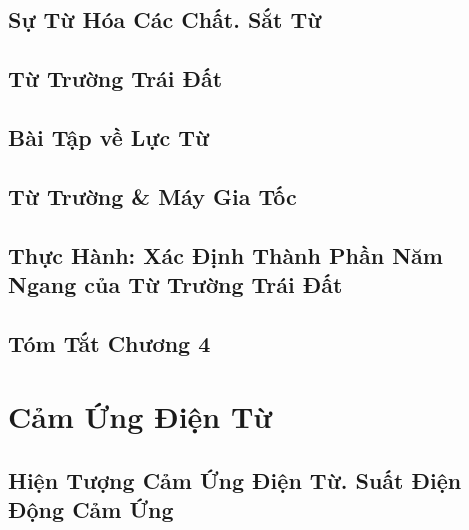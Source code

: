 \documentclass[oneside]{book}
\numberwithin{equation}{section}
\begin{document}
\section{Sự Từ Hóa Các Chất. Sắt Từ}


\section{Từ Trường Trái Đất}


\section{Bài Tập về Lực Từ}


\section{Từ Trường \& Máy Gia Tốc}


\section{Thực Hành: Xác Định Thành Phần Năm Ngang của Từ Trường Trái Đất}


\section{Tóm Tắt Chương 4}


\chapter{Cảm Ứng Điện Từ}

\section{Hiện Tượng Cảm Ứng Điện Từ. Suất Điện Động Cảm Ứng}
\end{document}
